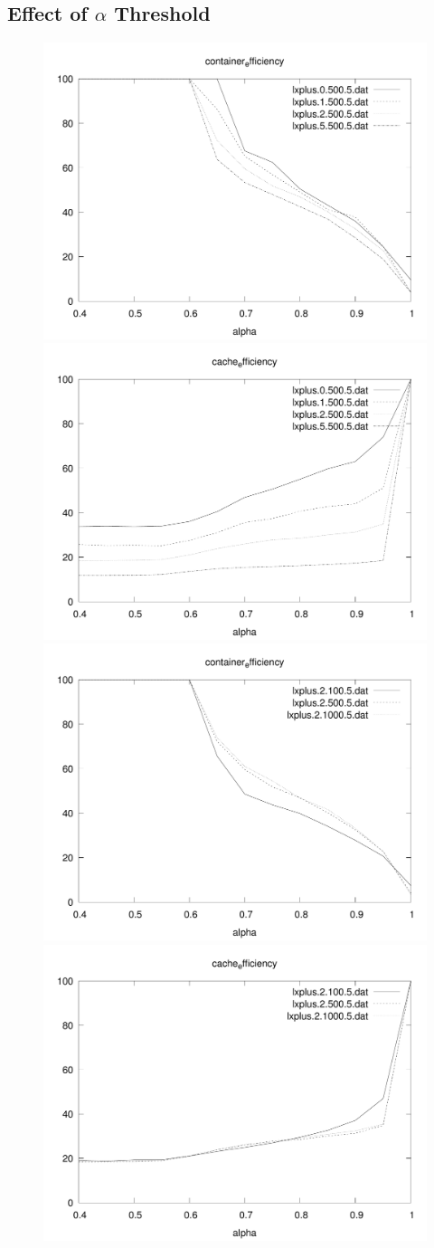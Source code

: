 \documentclass[sigconf]{acmart}
\begin{document}
\subsection{Effect of $\alpha$ Threshold}

\begin{figure}
\includegraphics[width=0.48\linewidth]{curated/sensitivity/container_efficiency_cache_percent_plt.pdf}
\hfill
\includegraphics[width=0.48\linewidth]{curated/sensitivity/cache_efficiency_cache_percent_plt.pdf}
\includegraphics[width=0.48\linewidth]{curated/sensitivity/container_efficiency_request_percent_plt.pdf}
\hfill
\includegraphics[width=0.48\linewidth]{curated/sensitivity/cache_efficiency_request_percent_plt.pdf}

\end{figure}
\end{document}
